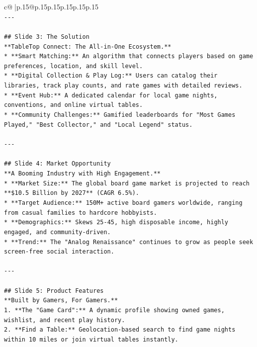 \documentclass{article}
\begin{document}
{\begin{supertabular}{c@{$\;$}|p{.15\linewidth}@{}p{.15\linewidth}p{.15\linewidth}p{.15\linewidth}p{.15\linewidth}p{.15\linewidth}}
{{{\\ 
\texttt{{-}{-}{-}} \\
\\ 
\texttt{\#\# Slide 3: The Solution} \\
\texttt{**TableTop Connect: The All{-}in{-}One Ecosystem.**} \\
\texttt{*   **Smart Matching:** An algorithm that connects players based on game preferences, location, and skill level.} \\
\texttt{*   **Digital Collection \& Play Log:** Users can catalog their libraries, track play counts, and rate games with detailed reviews.} \\
\texttt{*   **Event Hub:** A dedicated calendar for local game nights, conventions, and online virtual tables.} \\
\texttt{*   **Community Challenges:** Gamified leaderboards for "Most Games Played," "Best Collector," and "Local Legend" status.} \\
\\ 
\texttt{{-}{-}{-}} \\
\\ 
\texttt{\#\# Slide 4: Market Opportunity} \\
\texttt{**A Booming Industry with High Engagement.**} \\
\texttt{*   **Market Size:** The global board game market is projected to reach **\$10.5 Billion by 2027** (CAGR 6.5\%).} \\
\texttt{*   **Target Audience:** 150M+ active board gamers worldwide, ranging from casual families to hardcore hobbyists.} \\
\texttt{*   **Demographics:** Skews 25{-}45, high disposable income, highly engaged, and community{-}driven.} \\
\texttt{*   **Trend:** The "Analog Renaissance" continues to grow as people seek screen{-}free social interaction.} \\
\\ 
\texttt{{-}{-}{-}} \\
\\ 
\texttt{\#\# Slide 5: Product Features} \\
\texttt{**Built by Gamers, For Gamers.**} \\
\texttt{1.  **The "Game Card":** A dynamic profile showing owned games, wishlist, and recent play history.} \\
\texttt{2.  **Find a Table:** Geolocation{-}based search to find game nights within 10 miles or join virtual tables instantly.} \\
}}}
\end{supertabular}}
\end{document}
